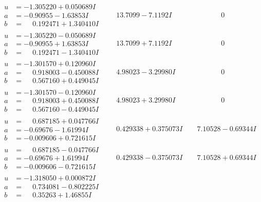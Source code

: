 \documentclass[1p]{elsarticle_modified}
\theoremstyle{definition}
\begin{document}
$$\begin{array}{c|c|c}
\begin{aligned}
u &= -1.305220 + 0.050689 I \\
a &= -0.90955 - 1.63853 I \\
b &= \phantom{-}0.192471 + 1.340410 I\end{aligned}
 & \phantom{-}13.7099 - 7.1192 I & \phantom{-0.000000 } 0 \\ \hline\begin{aligned}
u &= -1.305220 - 0.050689 I \\
a &= -0.90955 + 1.63853 I \\
b &= \phantom{-}0.192471 - 1.340410 I\end{aligned}
 & \phantom{-}13.7099 + 7.1192 I & \phantom{-0.000000 } 0 \\ \hline\begin{aligned}
u &= -1.301570 + 0.120960 I \\
a &= \phantom{-}0.918003 - 0.450088 I \\
b &= \phantom{-}0.567160 + 0.449045 I\end{aligned}
 & \phantom{-}4.98023 - 3.29980 I & \phantom{-0.000000 } 0 \\ \hline\begin{aligned}
u &= -1.301570 - 0.120960 I \\
a &= \phantom{-}0.918003 + 0.450088 I \\
b &= \phantom{-}0.567160 - 0.449045 I\end{aligned}
 & \phantom{-}4.98023 + 3.29980 I & \phantom{-0.000000 } 0 \\ \hline\begin{aligned}
u &= \phantom{-}0.687185 + 0.047766 I \\
a &= -0.69676 - 1.61994 I \\
b &= -0.009606 + 0.721615 I\end{aligned}
 & \phantom{-}0.429338 + 0.375073 I & \phantom{-}7.10528 - 0.69344 I \\ \hline\begin{aligned}
u &= \phantom{-}0.687185 - 0.047766 I \\
a &= -0.69676 + 1.61994 I \\
b &= -0.009606 - 0.721615 I\end{aligned}
 & \phantom{-}0.429338 - 0.375073 I & \phantom{-}7.10528 + 0.69344 I \\ \hline\begin{aligned}
u &= -1.318050 + 0.000872 I \\
a &= \phantom{-}0.734081 - 0.802225 I \\
b &= \phantom{-}0.35263 + 1.46855 I\end{aligned}

\end{array}$$
\end{document}
